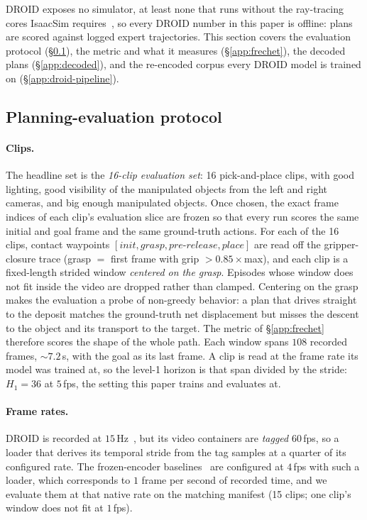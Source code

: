 DROID exposes no simulator, at least none that runs without the ray-tracing cores IsaacSim
requires~\citep{nvidia2025isaaclabgpuacceleratedsimulation}, so every DROID number in this
paper is offline: plans are scored against logged expert trajectories. This section
covers the evaluation protocol (\S\ref{app:protocol}), the metric and what it measures
(\S\ref{app:frechet}), the decoded plans (\S\ref{app:decoded}), and the re-encoded corpus
every DROID model is trained on (\S\ref{app:droid-pipeline}).

\subsection{Planning-evaluation protocol}
\label{app:protocol}

\paragraph{Clips.} The headline set is the \emph{16-clip evaluation set}: 16 pick-and-place
clips, with good lighting, good visibility of the manipulated objects from the left and
right cameras, and big enough manipulated objects. Once chosen, the exact frame indices of
each clip's evaluation slice are frozen so that every run scores the same initial and goal
frame and the same ground-truth actions. For each of the 16 clips, contact waypoints
$[\textit{init},\textit{grasp},\textit{pre-release},\textit{place}]$ are read off the
gripper-closure trace (grasp $=$ first frame with grip $>0.85\times$max), and each
clip is a fixed-length strided window \emph{centered on the grasp}. Episodes whose
window does not fit inside the video are dropped rather than clamped. Centering on
the grasp makes the evaluation a probe of non-greedy behavior: a plan that drives straight
to the deposit matches the ground-truth net displacement but misses the descent to the
object and its transport to the target. The metric of \S\ref{app:frechet} therefore scores
the shape of the whole path. Each window spans
$108$ recorded frames, $\sim$$7.2$\,s, with the goal as its last frame. A clip is read at
the frame rate its model was trained at, so the level-1 horizon is that span divided by the
stride: $H_1 = 36$ at $5$\,fps, the setting this paper trains and evaluates at.

\paragraph{Frame rates.} DROID is recorded at $15$\,Hz~\citep{khazatsky2024droid},
but its video containers are \emph{tagged} $60$\,fps, so a loader that derives its temporal
stride from the tag samples at a quarter of its configured rate. The frozen-encoder
baselines~\citep{terver2026whatdrives,assran2025vjepa2} are configured at $4$\,fps with such
a loader, which corresponds to $1$ frame per second of recorded time, and we evaluate them
at that native rate on the matching manifest (15 clips; one clip's window does not fit
at $1$\,fps).

